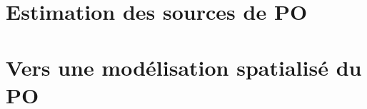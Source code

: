 \documentclass[a4paper,12pt]{book}
\begin{document}
% 
%
% 
%
% 
%
% 

\chapter{Estimation des sources de PO}
\label{cha:estimation_des_sources_de_PO}
\PartialToc
\clearpage
{}
\clearpage
\printbibliography[segment=\therefsegment,heading=subbibliography]

% 

\chapter{Vers une modélisation spatialisé du PO}
\label{cha:spatio_temporal_modelizing}
% 
\end{document}
